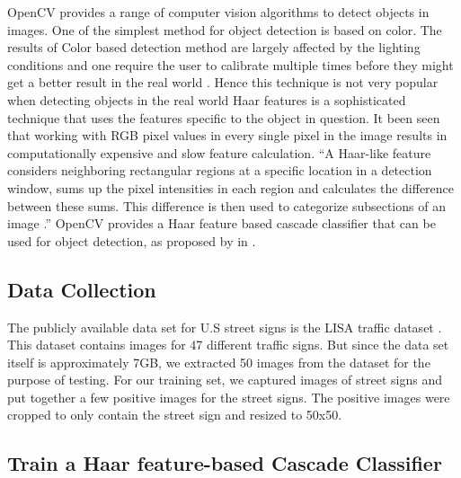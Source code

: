 \documentclass[9pt,twocolumn,twoside]{../../styles/osajnl}
\begin{document}
OpenCV provides a range of computer vision algorithms to detect
objects in images. One of the simplest method for object detection is
based on color. The results of Color based detection method are
largely affected by the lighting conditions and one require the user
to calibrate multiple times before they might get a better result in
the real world \cite{paper-objectdetection}. Hence this technique is
not very popular when detecting objects in the real world Haar
features is a sophisticated technique that uses the features specific
to the object in question. It been seen that working with RGB pixel
values in every single pixel in the image results in computationally
expensive and slow feature calculation. “A Haar-like feature considers
neighboring rectangular regions at a specific location in a detection
window, sums up the pixel intensities in each region and calculates
the difference between these sums. This difference is then used to
categorize subsections of an image \cite{paper-objectdetection}.”
OpenCV provides a Haar feature based cascade classifier that can be
used for object detection, as proposed by in \cite{paper-ROD}.

\subsection{Data Collection}

The publicly available data set for U.S street signs is the LISA
traffic dataset \cite{paper-lisadataset}. This dataset contains images
for 47 different traffic signs. But since the data set itself is
approximately 7GB, we extracted 50 images from the dataset for the
purpose of testing. For our training set, we captured images of street
signs and put together a few positive images for the street signs. The
positive images were cropped to only contain the street sign and
resized to 50x50.

\subsection{Train a Haar feature-based Cascade Classifier}
\end{document}
